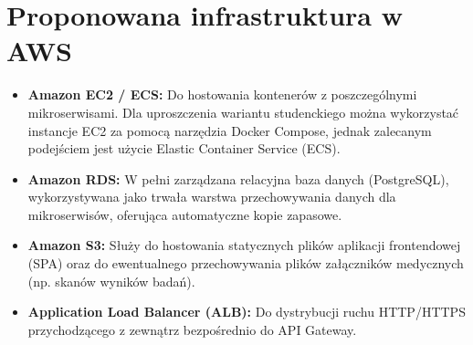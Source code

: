 \documentclass[12pt]{article}
\begin{document}
\section{Proponowana infrastruktura w AWS}
\begin{itemize}
    \item \textbf{Amazon EC2 / ECS:} Do hostowania kontenerów z poszczególnymi mikroserwisami. Dla uproszczenia wariantu studenckiego można wykorzystać instancje EC2 za pomocą narzędzia Docker Compose, jednak zalecanym podejściem jest użycie Elastic Container Service (ECS).
    \item \textbf{Amazon RDS:} W pełni zarządzana relacyjna baza danych (PostgreSQL), wykorzystywana jako trwała warstwa przechowywania danych dla mikroserwisów, oferująca automatyczne kopie zapasowe.
    \item \textbf{Amazon S3:} Służy do hostowania statycznych plików aplikacji frontendowej (SPA) oraz do ewentualnego przechowywania plików załączników medycznych (np. skanów wyników badań).
    \item \textbf{Application Load Balancer (ALB):} Do dystrybucji ruchu HTTP/HTTPS przychodzącego z zewnątrz bezpośrednio do API Gateway.
\end{itemize}
\end{document}
